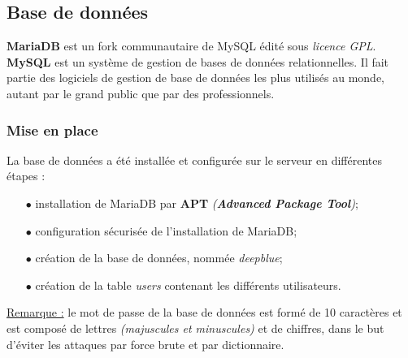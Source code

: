\subsection{Base de données}
\label{subsec:bd}

\textbf{MariaDB} est un fork communautaire de MySQL édité sous \textit{licence
GPL}. \\

\textbf{MySQL} est un système de gestion de bases de données relationnelles. Il fait
partie des logiciels de gestion de base de données les plus utilisés au monde,
autant par le grand public que par des professionnels.


\subsubsection{Mise en place}
\label{subsubsec:mise-en-place}

La base de données a été installée et configurée sur le serveur en différentes
étapes :
\begin{itemize}

    \item[$\bullet$] installation de MariaDB par \textbf{APT}
    \textit{(\textbf{Advanced Package Tool})};
    \item[$\bullet$] configuration sécurisée de l'installation de MariaDB;
    \item[$\bullet$] création de la base de données, nommée \textit{deepblue};
    \item[$\bullet$] création de la table \og \textit{users} \fg contenant les
    différents utilisateurs. \\

\end{itemize}

\underline{Remarque :} le mot de passe de la base de données est formé de 10
caractères et est composé de lettres \textit{(majuscules et minuscules)} et de
chiffres, dans le but d'éviter les attaques par force brute et par dictionnaire.



